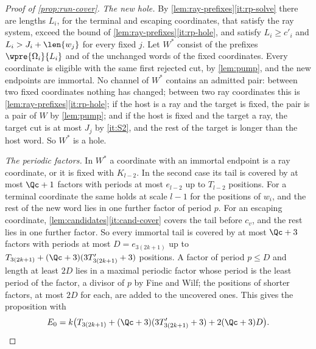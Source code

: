 \begin{proof}[Proof of \cref{prop:run-cover}]
\emph{The new hole.} By \cref{lem:ray-prefixes}\eqref{it:rp-solve} there are
lengths $L_i$, for the terminal and escaping coordinates, that satisfy the
ray system, exceed the bound of \cref{lem:ray-prefixes}\eqref{it:rp-hole},
and satisfy $L_i\ge c'_i$ and $L_i>J_i+\len{w_j}$ for every fixed $j$. Let
$W^*$ consist of the prefixes $\wpre{\Omega_i}{L_i}$ and of the unchanged
words of the fixed coordinates. Every coordinate is eligible with the same
first rejected cut, by \cref{lem:pump}, and the new endpoints are immortal.
No channel of $W^*$ contains an admitted pair: between two fixed coordinates
nothing has changed; between two ray coordinates this is
\cref{lem:ray-prefixes}\eqref{it:rp-hole}; if the host is a ray and the
target is fixed, the pair is a pair of $W$ by \cref{lem:pump}; and if the
host is fixed and the target a ray, the target cut is at most $J_j$ by
\ref{it:S2}, and the rest of the target is longer than the host word. So $W^*$ is
a hole.

\emph{The periodic factors.} In $W^*$ a coordinate with an immortal endpoint is a
ray coordinate, or it is fixed with $K_{l-2}$. In the second case its tail is
covered by at most $\Qc+1$ factors with periods at most $e_{l-2}$ up to
$T_{l-2}$ positions. For a terminal coordinate the same holds at scale
$l-1$ for the positions of $w_i$, and the rest of the new word lies in one
further factor of period $p$. For an escaping coordinate,
\cref{lem:candidates}\eqref{it:cand-cover} covers the tail before $c_v$, and
the rest lies in one further factor. So every immortal tail is covered by
at most $\Qc+3$ factors with periods at most $D=e_{3(2k+1)}$ up to
$T_{3(2k+1)}+(\Qc+3)(3T'_{3(2k+1)}+3)$ positions. A factor of period $p\le D$
and length at least $2D$ lies in a maximal periodic factor whose period is the
least period of the factor, a divisor of $p$ by Fine and Wilf; the positions
of shorter factors, at most $2D$ for each, are added to the uncovered ones.
This gives the proposition with
\[
  E_0=k\bigl(T_{3(2k+1)}+(\Qc+3)(3T'_{3(2k+1)}+3)+2(\Qc+3)D\bigr).\qedhere
\]
\end{proof}
